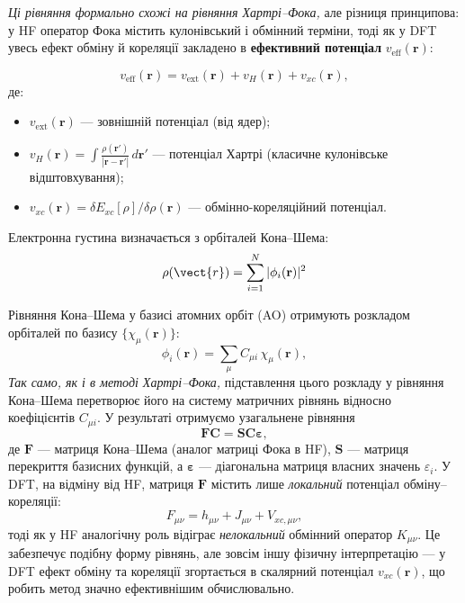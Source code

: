 \textit{Ці рівняння формально схожі на рівняння Хартрі--Фока,} але різниця принципова: у HF оператор Фока містить кулонівський і обмінний терміни, тоді як у DFT увесь ефект обміну й кореляції закладено в \textbf{ефективний потенціал} $v_{\text{eff}}(\mathbf{r})$:

\begin{equation}
	v_{\text{eff}}(\mathbf{r}) = v_{\text{ext}}(\mathbf{r}) + v_H(\mathbf{r}) + v_{xc}(\mathbf{r}),
\end{equation}
де:
\begin{itemize}
	\item $v_{\text{ext}}(\mathbf{r})$ --- зовнішній потенціал (від ядер);
	\item $v_H(\mathbf{r}) = \displaystyle\int \frac{\rho(\mathbf{r}')}{|\mathbf{r}-\mathbf{r}'|}\, d\mathbf{r}'$ --- потенціал Хартрі (класичне кулонівське відштовхування);
	\item $v_{xc}(\mathbf{r}) = \delta E_{xc}[\rho]/\delta \rho(\mathbf{r})$ --- обмінно-кореляційний потенціал.
\end{itemize}

Електронна густина визначається з орбіталей Кона--Шема:
\begin{equation}
	\rho(\vect{r}) = \sum_{i=1}^{N} |\phi_i(\mathbf{r})|^2 %
\end{equation}

Рівняння Кона--Шема у базисі атомних орбіт (AO) отримують розкладом
орбіталей по базису \(\{\chi_\mu(\mathbf r)\}\):
\begin{equation*}
	\phi_i(\mathbf r)=\sum_\mu C_{\mu i}\,\chi_\mu(\mathbf r),
\end{equation*}
\textit{Так само, як і в методі Хартрі--Фока,} підставлення цього розкладу у рівняння Кона--Шема
перетворює його на систему матричних рівнянь відносно коефіцієнтів \(C_{\mu i}\).
У результаті отримуємо узагальнене рівняння
\begin{equation*}
	\mathbf{F}\mathbf{C} = \mathbf{S}\mathbf{C}\boldsymbol{\varepsilon},
\end{equation*}
де \(\mathbf{F}\) --- матриця Кона--Шема (аналог матриці Фока в HF),
\(\mathbf{S}\) --- матриця перекриття базисних функцій,
а \(\boldsymbol{\varepsilon}\) --- діагональна матриця власних значень \(\varepsilon_i\).
%
У DFT, на відміну від HF, матриця \(\mathbf{F}\) містить лише \emph{локальний} потенціал обміну--кореляції:
\begin{equation*}
	F_{\mu\nu} = h_{\mu\nu} + J_{\mu\nu} + V_{xc,\mu\nu},
\end{equation*}
тоді як у HF аналогічну роль відіграє \emph{нелокальний} обмінний оператор \(K_{\mu\nu}\).
Це забезпечує подібну форму рівнянь, але зовсім іншу фізичну інтерпретацію ---
у DFT ефект обміну та кореляції згортається в скалярний потенціал \(v_{xc}(\mathbf r)\),
що робить метод значно ефективнішим обчислювально.

